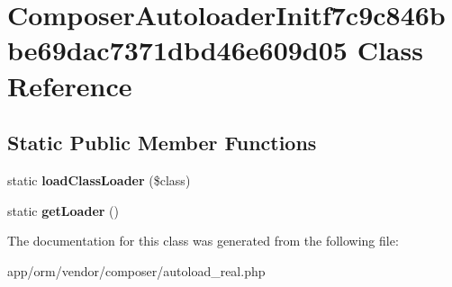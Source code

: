 \hypertarget{classComposerAutoloaderInitf7c9c846bbe69dac7371dbd46e609d05}{}\section{Composer\+Autoloader\+Initf7c9c846bbe69dac7371dbd46e609d05 Class Reference}
\label{classComposerAutoloaderInitf7c9c846bbe69dac7371dbd46e609d05}
\subsection*{Static Public Member Functions}
\begin{DoxyCompactItemize}
\item 
static {\bfseries load\+Class\+Loader} (\$class)\hypertarget{classComposerAutoloaderInitf7c9c846bbe69dac7371dbd46e609d05_a84491254fb4ac0fd4fba9ae7d72c377d}{}\label{classComposerAutoloaderInitf7c9c846bbe69dac7371dbd46e609d05_a84491254fb4ac0fd4fba9ae7d72c377d}

\item 
static {\bfseries get\+Loader} ()\hypertarget{classComposerAutoloaderInitf7c9c846bbe69dac7371dbd46e609d05_ac3cf956ea794141b97849bb1dde23924}{}\label{classComposerAutoloaderInitf7c9c846bbe69dac7371dbd46e609d05_ac3cf956ea794141b97849bb1dde23924}

\end{DoxyCompactItemize}


The documentation for this class was generated from the following file\+:\begin{DoxyCompactItemize}
\item 
app/orm/vendor/composer/autoload\+\_\+real.\+php\end{DoxyCompactItemize}
